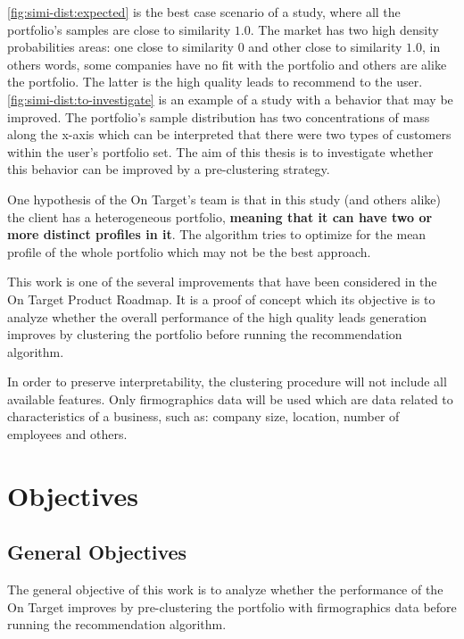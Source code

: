 \ref{fig:simi-dist:expected} is the best case scenario of a study, where all the portfolio's samples are close to similarity $1.0$. The market has two high density probabilities areas: one close to similarity $0$ and other close to similarity $1.0$, in others words, some companies have no fit with the portfolio and others are alike the portfolio. The latter is the high quality leads to recommend to the user. \ref{fig:simi-dist:to-investigate} is an example of a study with a behavior that may be improved. The portfolio's sample distribution has two concentrations of mass along the x-axis which can be interpreted that there were two types of customers within the user's portfolio set. The aim of this thesis is to investigate whether this behavior can be improved by a pre-clustering strategy.

One hypothesis of the On Target's team is that in this study (and others alike) the client has a heterogeneous portfolio, \textbf{meaning that it can have two or more distinct profiles in it}. The algorithm tries to optimize for the mean profile of the whole portfolio which may not be the best approach.

This work is one of the several improvements that have been considered in the On Target Product Roadmap. It is a proof of concept which its objective is to analyze whether the overall performance of the high quality leads generation improves by clustering the portfolio before running the recommendation algorithm. 

In order to preserve interpretability, the clustering procedure will not include all available features. Only firmographics data will be used \cite{wikipedia_firmographics} which are data related to characteristics of a business, such as: company size, location, number of employees and others.


\section{Objectives}

\subsection{General Objectives}

The general objective of this work is to analyze whether the performance of the On Target improves by pre-clustering the portfolio with firmographics data before running the recommendation algorithm.

